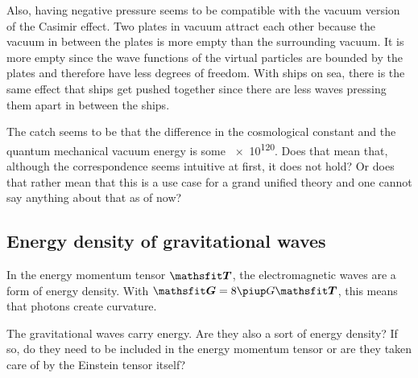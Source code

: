 Also, having negative pressure seems to be compatible with the vacuum version
of the Casimir effect. Two plates in vacuum attract each other because the
vacuum in between the plates is more empty than the surrounding vacuum. It is
more empty since the wave functions of the virtual particles are bounded by the
plates and therefore have less degrees of freedom. With ships on sea, there is
the same effect that ships get pushed together since there are less waves
pressing them apart in between the ships.

The catch seems to be that the difference in the cosmological constant and the
quantum mechanical vacuum energy is some \num{e120}. Does that mean that,
although the correspondence seems intuitive at first, it does not hold? Or does
that rather mean that this is a use case for a grand unified theory and one
cannot say anything about that as of now?

\vfill
\vspace*{10cm}

\subsection{Energy density of gravitational waves}

In the energy momentum tensor $\tens T$, the electromagnetic waves are a form
of energy density. With $\tens G = 8 \piup G \tens T$, this means that photons
create curvature.

The gravitational waves carry energy. Are they also a sort of energy density?
If so, do they need to be included in the energy momentum tensor or are they
taken care of by the Einstein tensor itself?

\vfill
\vspace*{10cm}

\IfFileExists{\bibliographyfile}{
    \printbibliography
}{}



